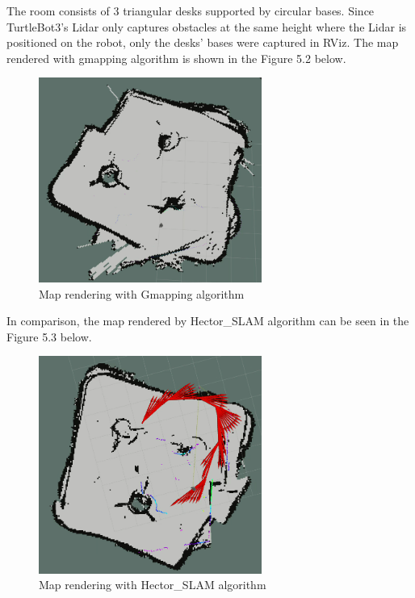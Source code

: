 \documentclass[12pt]{report}
\begin{document}
The room consists of 3 triangular desks supported by circular bases. Since TurtleBot3’s Lidar only captures obstacles at the same height where the Lidar is positioned on the robot, only the desks’ bases were captured in RViz. The map rendered with gmapping algorithm is shown in the Figure 5.2 below.\par
\begin{figure}[H]
        \centering
        \includegraphics[width=0.65\textwidth]{Fig10.png}
        \caption{Map rendering with Gmapping algorithm}
        \label{fig:10}
\end{figure}
\vspace{1em}
In comparison, the map rendered by Hector\_SLAM algorithm can be seen in the Figure 5.3 below.\par
\begin{figure}[H]
        \centering
        \includegraphics[width=0.65\textwidth]{Fig11.png}
        \caption{Map rendering with Hector\_SLAM algorithm}
        \label{fig:11}
\end{figure}
\end{document}
